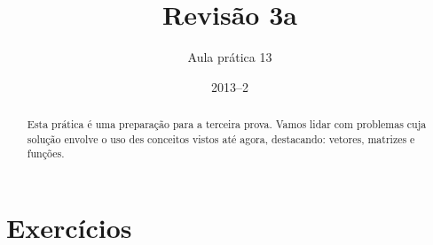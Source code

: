 \documentclass[11pt]{practice}
\begin{document}
\subtitle{Aula prática 13}
\title{Revisão 3a}
\author{}
\date{2013--2}
\maketitle

\begin{abstract}
  Esta prática é uma preparação para a terceira prova. Vamos lidar com
  problemas cuja solução envolve o uso des conceitos vistos até agora,
  destacando: vetores, matrizes e funções.
\end{abstract}


\section{Exercícios}
\end{document}

